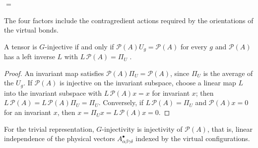 \begin{definition}
\begin{tenkzequation}
\begin{tenkz}[rows={wire,wire,wire}, cols=3, bonds=none]
        \end{tenkz}
        $=$
        \begin{tenkz}[rows={wire}, cols=1, bonds=none]
        \end{tenkz}
    \end{tenkzequation}
    The four factors include the contragredient actions required by the
    orientations of the virtual bonds.
\end{definition}

\begin{lemma}%
    \label{thm:peps_g_injective_left_inverse}
    \leanok
    A tensor is $G$-injective if and only if
    $\mathcal{P}(A)U_g=\mathcal{P}(A)$ for every $g$ and $\mathcal{P}(A)$ has a
    left inverse $L$ with $L\,\mathcal{P}(A)=\Pi_U$
    \cite[Section~``Two dimensions: $G$-injective PEPS'']{Schuch2010PEPS}.
\end{lemma}

\begin{proof}\leanok
    An invariant map satisfies $\mathcal{P}(A)\Pi_U=\mathcal{P}(A)$, since
    $\Pi_U$ is the average of the $U_g$. If $\mathcal{P}(A)$ is injective on
    the invariant subspace, choose a linear map $L$ into the invariant
    subspace with $L\,\mathcal{P}(A)x=x$ for invariant $x$; then
    $L\,\mathcal{P}(A)=L\,\mathcal{P}(A)\Pi_U=\Pi_U$. Conversely, if
    $L\,\mathcal{P}(A)=\Pi_U$ and $\mathcal{P}(A)x=0$ for an invariant $x$, then
    $x=\Pi_Ux=L\,\mathcal{P}(A)x=0$.
\end{proof}

\begin{lemma}%
    \label{thm:peps_g_injective_trivial}
    \leanok
    For the trivial representation, $G$-injectivity is injectivity of
    $\mathcal{P}(A)$, that is, linear independence of the physical vectors
    $A^{\bullet}_{\alpha\beta\gamma\delta}$ indexed by the virtual
    configurations.
\end{lemma}

